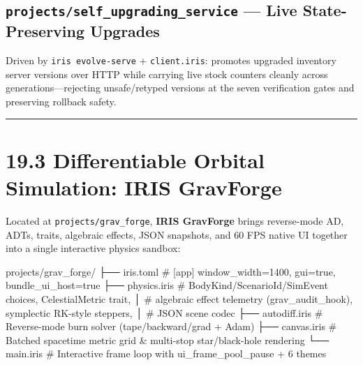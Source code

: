 \documentclass[
  english,
  oneside]{book}
\newenvironment{Shaded}{\begin{snugshade}}{\end{snugshade}}
\newcommand{\NormalTok}[1]{\textcolor[rgb]{0.83,0.83,0.83}{#1}}
\begin{document}
\subsection{\texorpdfstring{\texttt{projects/self\_upgrading\_service}
--- Live State-Preserving
Upgrades}{projects/self\_upgrading\_service --- Live State-Preserving Upgrades}}\label{projectsself_upgrading_service-live-state-preserving-upgrades}

Driven by \texttt{iris\ evolve-serve} + \texttt{client.iris}: promotes
upgraded inventory server versions over HTTP while carrying live stock
counters cleanly across generations---rejecting unsafe/retyped versions
at the seven verification gates and preserving rollback safety.

\begin{center}\rule{0.5\linewidth}{0.5pt}\end{center}

\section{19.3 Differentiable Orbital Simulation: IRIS
GravForge}\label{differentiable-orbital-simulation-iris-gravforge}

Located at \texttt{projects/grav\_forge}, \textbf{IRIS GravForge} brings
reverse-mode AD, ADTs, traits, algebraic effects, JSON snapshots, and 60
FPS native UI together into a single interactive physics sandbox:

\begin{Shaded}
\begin{Highlighting}[]
\NormalTok{projects/grav\_forge/}
\NormalTok{├── iris.toml      \# [app] window\_width=1400, gui=true, bundle\_ui\_host=true}
\NormalTok{├── physics.iris   \# BodyKind/ScenarioId/SimEvent choices, CelestialMetric trait,}
\NormalTok{│                  \# algebraic effect telemetry (\textasciigrave{}grav\_audit\_hook\textasciigrave{}), symplectic RK{-}style steppers,}
\NormalTok{│                  \# JSON scene codec}
\NormalTok{├── autodiff.iris  \# Reverse{-}mode burn solver (\textasciigrave{}tape\textasciigrave{}/\textasciigrave{}backward\textasciigrave{}/\textasciigrave{}grad\textasciigrave{} + Adam)}
\NormalTok{├── canvas.iris    \# Batched spacetime metric grid \& multi{-}stop star/black{-}hole rendering}
\NormalTok{└── main.iris      \# Interactive frame loop with \textasciigrave{}ui\_frame\_pool\_pause\textasciigrave{} + 6 themes}
\end{Highlighting}
\end{Shaded}
\end{document}
